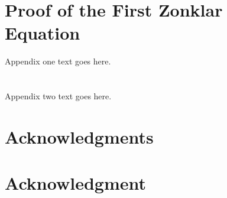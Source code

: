 \begin{comment}

 if have a single appendix:
\appendix[Proof of the Zonklar Equations]
 or
\appendix   %
 do not use \section anymore after \appendix, only \section*
 is possibly needed

 use appendices with more than one appendix
 then use \section to start each appendix
 you must declare a \section before using any
 \subsection or using \label (\appendices by itself
 starts a section numbered zero.)
\end{comment}


\appendices
\section{Proof of the First Zonklar Equation}
Appendix one text goes here.

\section{}
Appendix two text goes here.


\ifCLASSOPTIONcompsoc
  \section*{Acknowledgments}
\else
  \section*{Acknowledgment}
\fi


